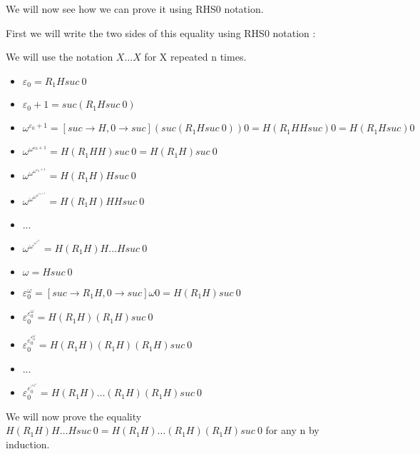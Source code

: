 \documentclass[10pt]{article}
\begin{document}
We will now see how we can prove it using RHS0 notation.

First we will write the two sides of this equality using RHS0 notation :

We will use the notation \( X \ldots X \) for X repeated n times.

\begin{itemize}
     \setlength{\itemsep}{1pt}
     \setlength{\parskip}{0pt}
     \setlength{\parsep}{0pt}
\item \( \varepsilon_0 = R_1 H suc\ 0 \)
\item \( \varepsilon_0 + 1 = suc (R_1 H suc\ 0) \)
\item \( \omega^{\varepsilon_0+1} = [suc \rightarrow H, 0 \rightarrow suc] (suc (R_1 H suc\ 0)) 0 = H (R_1 H H suc) 0 = H (R_1 H suc) 0 \)
\item \( \omega^{\omega^{\varepsilon_0+1}} = H (R_1 H H) suc\ 0 = H (R_1 H) suc\ 0 \)
\item \( \omega^{\omega^{\omega^{\varepsilon_0+1}}} = H (R_1 H) H suc\ 0 \)
\item \( \omega^{\omega^{\omega^{\omega^{\varepsilon_0+1}}}} = H (R_1 H) H H suc\ 0 \)
\item \( \ldots \)
\item \( \omega^{\omega^{\vdots^{\omega^{\omega^{\varepsilon_0}}}}} = H (R_1 H) H \ldots H suc\ 0 \)
\end{itemize}

\begin{itemize}
     \setlength{\itemsep}{1pt}
     \setlength{\parskip}{0pt}
     \setlength{\parsep}{0pt}
\item \( \omega = H suc\ 0 \)
\item \( \varepsilon_0^\omega = [suc \rightarrow R_1 H, 0 \rightarrow suc] \omega 0 = H (R_1 H) suc\ 0 \)
\item \( \varepsilon_0^{\varepsilon_0^\omega} = H (R_1 H) (R_1 H) suc\ 0 \)
\item \( \varepsilon_0^{\varepsilon_0^{\varepsilon_0^\omega}} = H (R_1 H) (R_1 H) (R_1 H) suc\ 0 \)
\item \( \ldots \)
\item \( \varepsilon_0^{\varepsilon_0^{\vdots^{{\varepsilon_0}^\omega}}} = H (R_1 H) \ldots (R_1 H) (R_1 H) suc\ 0 \)
\end{itemize}

We will now prove the equality \( H (R_1 H) H \ldots H suc\ 0 = H (R_1 H) \ldots (R_1 H) (R_1 H) suc\ 0 \) for any n by induction.

\bigskip
\end{document}
